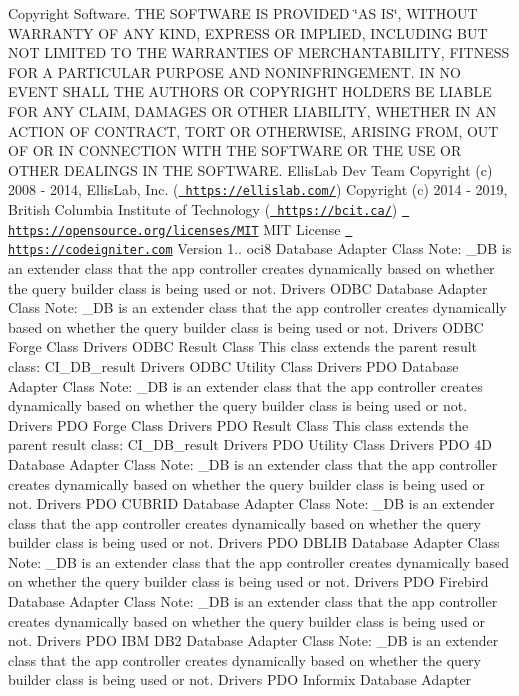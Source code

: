 \begin{DoxyCopyright}{Copyright}
Software. T\+HE S\+O\+F\+T\+W\+A\+RE IS P\+R\+O\+V\+I\+D\+ED \char`\"{}\+A\+S I\+S\char`\"{}, W\+I\+T\+H\+O\+UT W\+A\+R\+R\+A\+N\+TY OF A\+NY K\+I\+ND, E\+X\+P\+R\+E\+SS OR I\+M\+P\+L\+I\+ED, I\+N\+C\+L\+U\+D\+I\+NG B\+UT N\+OT L\+I\+M\+I\+T\+ED TO T\+HE W\+A\+R\+R\+A\+N\+T\+I\+ES OF M\+E\+R\+C\+H\+A\+N\+T\+A\+B\+I\+L\+I\+TY, F\+I\+T\+N\+E\+SS F\+OR A P\+A\+R\+T\+I\+C\+U\+L\+AR P\+U\+R\+P\+O\+SE A\+ND N\+O\+N\+I\+N\+F\+R\+I\+N\+G\+E\+M\+E\+NT. IN NO E\+V\+E\+NT S\+H\+A\+LL T\+HE A\+U\+T\+H\+O\+RS OR C\+O\+P\+Y\+R\+I\+G\+HT H\+O\+L\+D\+E\+RS BE L\+I\+A\+B\+LE F\+OR A\+NY C\+L\+A\+IM, D\+A\+M\+A\+G\+ES OR O\+T\+H\+ER L\+I\+A\+B\+I\+L\+I\+TY, W\+H\+E\+T\+H\+ER IN AN A\+C\+T\+I\+ON OF C\+O\+N\+T\+R\+A\+CT, T\+O\+RT OR O\+T\+H\+E\+R\+W\+I\+SE, A\+R\+I\+S\+I\+NG F\+R\+OM, O\+UT OF OR IN C\+O\+N\+N\+E\+C\+T\+I\+ON W\+I\+TH T\+HE S\+O\+F\+T\+W\+A\+RE OR T\+HE U\+SE OR O\+T\+H\+ER D\+E\+A\+L\+I\+N\+GS IN T\+HE S\+O\+F\+T\+W\+A\+RE.  Ellis\+Lab Dev Team  Copyright (c) 2008 -\/ 2014, Ellis\+Lab, Inc. (\href{https://ellislab.com/}{\texttt{ https\+://ellislab.\+com/}})  Copyright (c) 2014 -\/ 2019, British Columbia Institute of Technology (\href{https://bcit.ca/}{\texttt{ https\+://bcit.\+ca/}})  \href{https://opensource.org/licenses/MIT}{\texttt{ https\+://opensource.\+org/licenses/\+M\+IT}} M\+IT License  \href{https://codeigniter.com}{\texttt{ https\+://codeigniter.\+com}}  Version 1..  oci8 Database Adapter Class Note\+: \+\_\+\+DB is an extender class that the app controller creates dynamically based on whether the query builder class is being used or not.  Drivers O\+D\+BC Database Adapter Class Note\+: \+\_\+\+DB is an extender class that the app controller creates dynamically based on whether the query builder class is being used or not.  Drivers O\+D\+BC Forge Class  Drivers O\+D\+BC Result Class This class extends the parent result class\+: C\+I\+\_\+\+D\+B\+\_\+result  Drivers O\+D\+BC Utility Class  Drivers P\+DO Database Adapter Class Note\+: \+\_\+\+DB is an extender class that the app controller creates dynamically based on whether the query builder class is being used or not.  Drivers P\+DO Forge Class  Drivers P\+DO Result Class This class extends the parent result class\+: C\+I\+\_\+\+D\+B\+\_\+result  Drivers P\+DO Utility Class  Drivers P\+DO 4D Database Adapter Class Note\+: \+\_\+\+DB is an extender class that the app controller creates dynamically based on whether the query builder class is being used or not.  Drivers P\+DO C\+U\+B\+R\+ID Database Adapter Class Note\+: \+\_\+\+DB is an extender class that the app controller creates dynamically based on whether the query builder class is being used or not.  Drivers P\+DO D\+B\+L\+IB Database Adapter Class Note\+: \+\_\+\+DB is an extender class that the app controller creates dynamically based on whether the query builder class is being used or not.  Drivers P\+DO Firebird Database Adapter Class Note\+: \+\_\+\+DB is an extender class that the app controller creates dynamically based on whether the query builder class is being used or not.  Drivers P\+DO I\+BM D\+B2 Database Adapter Class Note\+: \+\_\+\+DB is an extender class that the app controller creates dynamically based on whether the query builder class is being used or not.  Drivers P\+DO Informix Database Adapter 
\end{DoxyCopyright}
